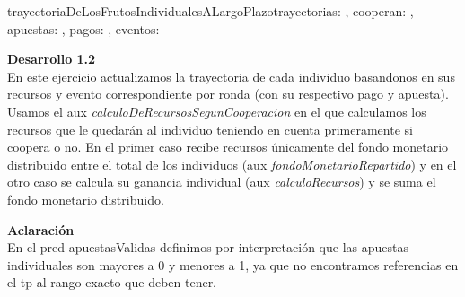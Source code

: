 \documentclass[10pt,a4paper]{article}
\begin{document}
\begin{proc}{trayectoriaDeLosFrutosIndividualesALargoPlazo}{\Inout trayectorias: \TLista{\TLista{\float}}, \In cooperan: \TLista{\bool}, \In apuestas:
\TLista{\TLista{\float}}, \In pagos: \TLista{\TLista{\float}}, \In eventos: \TLista{\TLista{\nat}}}{}


    
    \textbf{Desarrollo 1.2} \\
    En este ejercicio actualizamos la trayectoria de cada individuo basandonos en sus recursos y evento correspondiente por ronda (con su respectivo pago y apuesta). Usamos el aux \textit{calculoDeRecursosSegunCooperacion} en el que calculamos los recursos que le quedarán al individuo teniendo en cuenta primeramente si coopera o no. En el primer caso recibe recursos únicamente del fondo monetario distribuido entre el total de los individuos (aux \textit{fondoMonetarioRepartido}) y en el otro caso se calcula su ganancia individual (aux \textit{calculoRecursos}) y se suma el fondo monetario distribuido.
    
    \textbf{Aclaración} \\
    En el pred apuestasValidas definimos por interpretación que las apuestas individuales son mayores a 0 y menores a 1, ya que no encontramos referencias en el tp al rango exacto que deben tener.
    




\end{proc}
\end{document}
